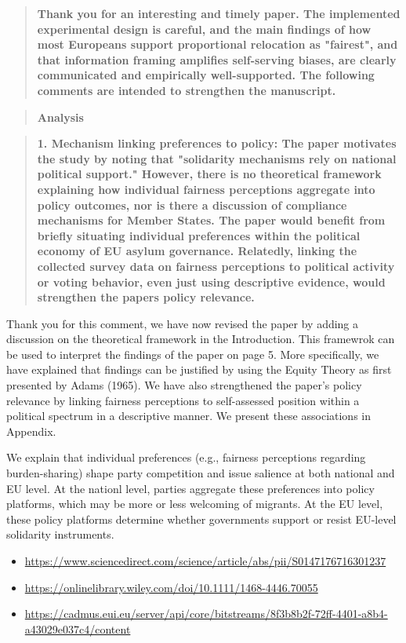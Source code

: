 \documentclass[
  11pt,
]{article}
\providecommand{\tightlist}{%
  \setlength{\itemsep}{0pt}\setlength{\parskip}{0pt}}
\begin{document}
\begin{quote}
\textbf{Thank you for an interesting and timely paper. The implemented experimental design is careful, and the main findings of how most Europeans support proportional relocation as "fairest", and that information framing amplifies self-serving biases, are clearly communicated and empirically well-supported. The following comments are intended to strengthen the manuscript.}
\end{quote}

\begin{quote}
\textbf{Analysis}
\end{quote}

\begin{quote}
\textbf{1. Mechanism linking preferences to policy: The paper motivates the study by noting that "solidarity mechanisms rely on national political support." However, there is no theoretical framework explaining how individual fairness perceptions aggregate into policy outcomes, nor is there a discussion of compliance mechanisms for Member States. The paper would benefit from briefly situating individual preferences within the political economy of EU asylum governance. Relatedly, linking the collected survey data on fairness perceptions to political activity or voting behavior, even just using descriptive evidence, would strengthen the paper\textquotesingle s policy relevance.}
\end{quote}

Thank you for this comment, we have now revised the paper by adding a discussion on the theoretical framework in the Introduction. This framewrok can be used to interpret the findings of the paper on page 5. More specifically, we have explained that findings can be justified by using the Equity Theory as first presented by Adams (1965). We have also strengthened the paper's policy relevance by linking fairness perceptions to self-assessed position within a political spectrum in a descriptive manner. We present these associations in Appendix.

We explain that individual preferences (e.g., fairness perceptions regarding burden-sharing) shape party competition and issue salience at both national and EU level. At the nationl level, parties aggregate these preferences into policy platforms, which may be more or less welcoming of migrants. At the EU level, these policy platforms determine whether governments support or resist EU-level solidarity instruments.

\begin{itemize}
\tightlist
\item
  \url{https://www.sciencedirect.com/science/article/abs/pii/S0147176716301237}
\item
  \url{https://onlinelibrary.wiley.com/doi/10.1111/1468-4446.70055}
\item
  \url{https://cadmus.eui.eu/server/api/core/bitstreams/8f3b8b2f-72ff-4401-a8b4-a43029e037c4/content}
\end{itemize}
\end{document}
